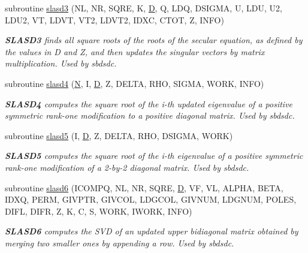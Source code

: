 \begin{DoxyCompactItemize}
subroutine \hyperlink{group__auxOTHERauxiliary_ga4359e33241fa45b40ca5b25e6bee9054}{slasd3} (N\+L, N\+R, S\+Q\+R\+E, K, \hyperlink{odrpack_8h_a7dae6ea403d00f3687f24a874e67d139}{D}, Q, L\+D\+Q, D\+S\+I\+G\+M\+A, U, L\+D\+U, U2, L\+D\+U2, V\+T, L\+D\+V\+T, V\+T2, L\+D\+V\+T2, I\+D\+X\+C, C\+T\+O\+T, Z, I\+N\+F\+O)
\begin{DoxyCompactList}\small\item\em {\bfseries S\+L\+A\+S\+D3} finds all square roots of the roots of the secular equation, as defined by the values in D and Z, and then updates the singular vectors by matrix multiplication. Used by sbdsdc. \end{DoxyCompactList}\item 
subroutine \hyperlink{group__auxOTHERauxiliary_ga6680aa4ad62702cd9a00d7530c8ab53a}{slasd4} (\hyperlink{polmisc_8c_a0240ac851181b84ac374872dc5434ee4}{N}, I, \hyperlink{odrpack_8h_a7dae6ea403d00f3687f24a874e67d139}{D}, Z, D\+E\+L\+T\+A, R\+H\+O, S\+I\+G\+M\+A, W\+O\+R\+K, I\+N\+F\+O)
\begin{DoxyCompactList}\small\item\em {\bfseries S\+L\+A\+S\+D4} computes the square root of the i-\/th updated eigenvalue of a positive symmetric rank-\/one modification to a positive diagonal matrix. Used by sbdsdc. \end{DoxyCompactList}\item 
subroutine \hyperlink{group__auxOTHERauxiliary_ga19de62ad22e8492c93ac450198557d05}{slasd5} (I, \hyperlink{odrpack_8h_a7dae6ea403d00f3687f24a874e67d139}{D}, Z, D\+E\+L\+T\+A, R\+H\+O, D\+S\+I\+G\+M\+A, W\+O\+R\+K)
\begin{DoxyCompactList}\small\item\em {\bfseries S\+L\+A\+S\+D5} computes the square root of the i-\/th eigenvalue of a positive symmetric rank-\/one modification of a 2-\/by-\/2 diagonal matrix. Used by sbdsdc. \end{DoxyCompactList}\item 
subroutine \hyperlink{group__auxOTHERauxiliary_ga49655eb79b1745feabd7e9069f05e485}{slasd6} (I\+C\+O\+M\+P\+Q, N\+L, N\+R, S\+Q\+R\+E, \hyperlink{odrpack_8h_a7dae6ea403d00f3687f24a874e67d139}{D}, V\+F, V\+L, A\+L\+P\+H\+A, B\+E\+T\+A, I\+D\+X\+Q, P\+E\+R\+M, G\+I\+V\+P\+T\+R, G\+I\+V\+C\+O\+L, L\+D\+G\+C\+O\+L, G\+I\+V\+N\+U\+M, L\+D\+G\+N\+U\+M, P\+O\+L\+E\+S, D\+I\+F\+L, D\+I\+F\+R, Z, K, C, S, W\+O\+R\+K, I\+W\+O\+R\+K, I\+N\+F\+O)
\begin{DoxyCompactList}\small\item\em {\bfseries S\+L\+A\+S\+D6} computes the S\+V\+D of an updated upper bidiagonal matrix obtained by merging two smaller ones by appending a row. Used by sbdsdc. \end{DoxyCompactList}\item 

\end{DoxyCompactItemize}
